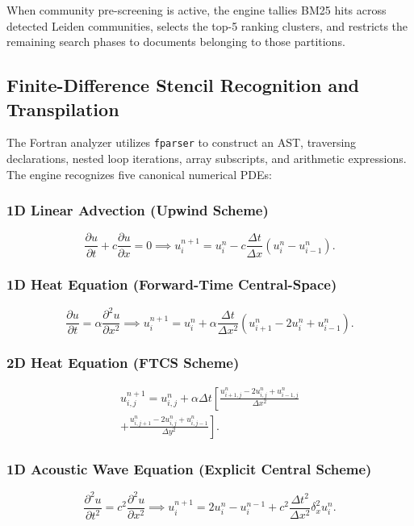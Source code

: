 \documentclass[conference]{IEEEtran}
\begin{document}
When community pre-screening is active, the engine tallies BM25 hits across detected Leiden communities, selects the top-5 ranking clusters, and restricts the remaining search phases to documents belonging to those partitions.

\subsection{Finite-Difference Stencil Recognition and Transpilation}
The Fortran analyzer utilizes \texttt{fparser} to construct an AST, traversing declarations, nested loop iterations, array subscripts, and arithmetic expressions. The engine recognizes five canonical numerical PDEs:

\subsubsection{1D Linear Advection (Upwind Scheme)}
\begin{equation}
\label{eq:advection}
\frac{\partial u}{\partial t} + c \frac{\partial u}{\partial x} = 0 \implies u_i^{n+1} = u_i^n - c \frac{\Delta t}{\Delta x}(u_i^n - u_{i-1}^n).
\end{equation}

\subsubsection{1D Heat Equation (Forward-Time Central-Space)}
\begin{equation}
\label{eq:heat1d}
\frac{\partial u}{\partial t} = \alpha \frac{\partial^2 u}{\partial x^2} \implies u_i^{n+1} = u_i^n + \alpha \frac{\Delta t}{\Delta x^2}(u_{i+1}^n - 2u_i^n + u_{i-1}^n).
\end{equation}

\subsubsection{2D Heat Equation (FTCS Scheme)}
\begin{align}
\label{eq:heat2d}
u_{i,j}^{n+1} = u_{i,j}^n + \alpha \Delta t \left[ \frac{u_{i+1,j}^n - 2u_{i,j}^n + u_{i-1,j}^n}{\Delta x^2} \right. \nonumber \\
\left. + \frac{u_{i,j+1}^n - 2u_{i,j}^n + u_{i,j-1}^n}{\Delta y^2} \right].
\end{align}

\subsubsection{1D Acoustic Wave Equation (Explicit Central Scheme)}
\begin{equation}
\label{eq:wave1d}
\frac{\partial^2 u}{\partial t^2} = c^2 \frac{\partial^2 u}{\partial x^2} \implies u_i^{n+1} = 2u_i^n - u_i^{n-1} + c^2 \frac{\Delta t^2}{\Delta x^2} \delta_x^2 u_i^n.
\end{equation}
\end{document}
